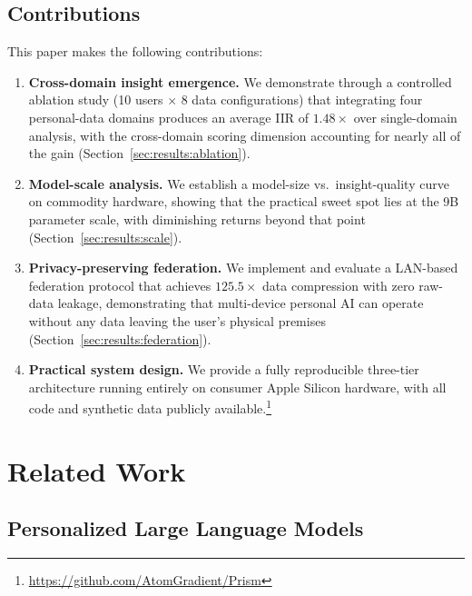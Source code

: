 \documentclass[11pt,a4paper]{article}
\newcommand{\iir}{\textsc{IIR}}
\begin{document}
\subsection{Contributions}

This paper makes the following contributions:

\begin{enumerate}[leftmargin=*,itemsep=2pt]
  \item \textbf{Cross-domain insight emergence.} We demonstrate through a
    controlled ablation study (10 users $\times$ 8 data configurations) that
    integrating four personal-data domains produces an average \iir{} of
    $1.48\times$ over single-domain analysis, with the cross-domain scoring
    dimension accounting for nearly all of the gain (Section~\ref{sec:results:ablation}).

  \item \textbf{Model-scale analysis.} We establish a model-size vs.\
    insight-quality curve on commodity hardware, showing that the practical
    sweet spot lies at the 9B parameter scale, with diminishing returns beyond
    that point (Section~\ref{sec:results:scale}).

  \item \textbf{Privacy-preserving federation.} We implement and evaluate a
    LAN-based federation protocol that achieves $125.5\times$ data compression
    with zero raw-data leakage, demonstrating that multi-device personal AI can
    operate without any data leaving the user's physical premises
    (Section~\ref{sec:results:federation}).

  \item \textbf{Practical system design.} We provide a fully reproducible
    three-tier architecture running entirely on consumer Apple Silicon hardware,
    with all code and synthetic data publicly available.\footnote{%
      \url{https://github.com/AtomGradient/Prism}}
\end{enumerate}


\section{Related Work}
\label{sec:related}

\subsection{Personalized Large Language Models}
\end{document}
